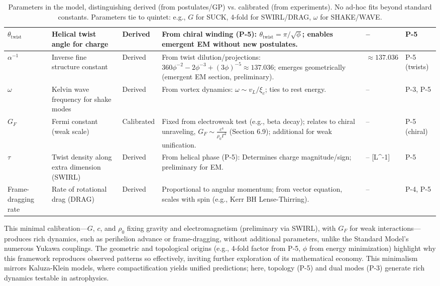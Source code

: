 \begin{table}[H]
\begin{tabularx}{\linewidth}{|p{1.5cm}|p{2cm}|l|X|p{3cm}|p{3cm}|}
\hline
$\theta_{\text{twist}}$ & Helical twist angle for charge & Derived & From chiral winding (P-5): $\theta_{\text{twist}} = \pi / \sqrt{\phi}$; enables emergent EM without new postulates. & -- & P-5 \\
\hline
$\alpha^{-1}$ & Inverse fine structure constant & Derived & From twist dilution/projections: $360 \phi^{-2} - 2 \phi^{-3} + (3 \phi)^{-5} \approx 137.036$; emerges geometrically (emergent EM section, preliminary). & $\approx 137.036$ & P-5 (twists) \\
\hline
$\omega$ & Kelvin wave frequency for shake modes & Derived & From vortex dynamics: $\omega \sim v_L / \xi_c$; ties to rest energy. & -- & P-3, P-5 \\
\hline
$G_F$ & Fermi constant (weak scale) & Calibrated & Fixed from electroweak test (e.g., beta decay); relates to chiral unraveling, $G_F \sim \frac{c^4}{\rho_0 \Gamma^2}$ (Section 6.9); additional for weak unification. & -- & P-5 (chiral) \\
\hline
$\tau$ & Twist density along extra dimension (SWIRL) & Derived & From helical phase (P-5): Determines charge magnitude/sign; preliminary for EM. & -- [L^{-1}] & P-5 \\
\hline
Frame-dragging rate & Rate of rotational drag (DRAG) & Derived & Proportional to angular momentum; from vector equation, scales with spin (e.g., Kerr BH Lense-Thirring). & -- & P-4, P-5 \\
\hline
\end{tabularx}
\caption{Parameters in the model, distinguishing derived (from postulates/GP) vs. calibrated (from experiments). No ad-hoc fits beyond standard constants. Parameters tie to quintet: e.g., $G$ for SUCK, 4-fold for SWIRL/DRAG, $\omega$ for SHAKE/WAVE.}
\label{tab:parameters}
\end{table}

This minimal calibration---$G$, $c$, and $\rho_0$ fixing gravity and electromagnetism (preliminary via SWIRL), with $G_F$ for weak interactions---produces rich dynamics, such as perihelion advance or frame-dragging, without additional parameters, unlike the Standard Model's numerous Yukawa couplings. The geometric and topological origins (e.g., 4-fold factor from P-5, $\phi$ from energy minimization) highlight why this framework reproduces observed patterns so effectively, inviting further exploration of its mathematical economy. This minimalism mirrors Kaluza-Klein models, where compactification yields unified predictions; here, topology (P-5) and dual modes (P-3) generate rich dynamics testable in astrophysics.


